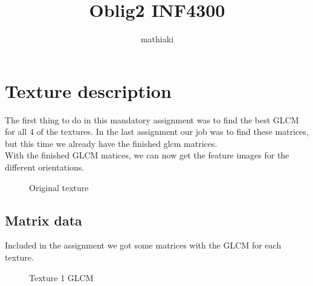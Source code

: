 \documentclass{article}
\title{Oblig2 INF4300}
\author{mathiaki}
\begin{document}
\maketitle

\newpage
\tableofcontents
\newpage

\section{Texture description}
	The first thing to do in this mandatory assignment was to find the best GLCM for all 4 of the textures. In the last assignment our job was to find these matrices, but this time we already have the finished glcm matrices.\\
	
	With the finished GLCM matices, we can now get the feature images for the different orientations.\\
	\begin{figure}[h]%
		\centering
    	\caption{Original texture}%
    	\label{fig:original_texture}%
	\end{figure}	
\newpage
\subsection{Matrix data}
	Included in the assignment we got some matrices with the GLCM for each texture.
	
	
	\begin{figure}[h!]%
		\centering
    	\caption{Texture 1 GLCM}%
    	\label{fig:o1_f1}%
	\end{figure}
\end{document}
